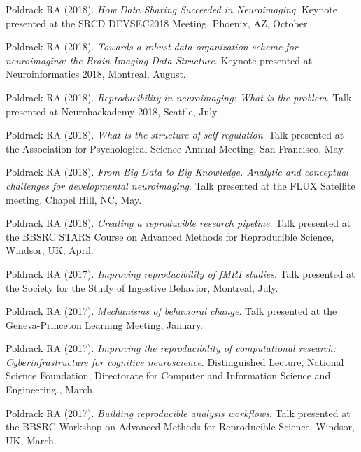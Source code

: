 \documentclass[10pt, letterpaper]{article}
\begin{document}
Poldrack RA (2018). \emph{How Data Sharing Succeeded in Neuroimaging}. Keynote presented at the SRCD DEVSEC2018 Meeting, Phoenix, AZ, October. \vspace{2mm}

Poldrack RA (2018). \emph{Towards a robust data organization scheme for neuroimaging: the Brain Imaging Data Structure}. Keynote presented at Neuroinformatics 2018, Montreal, August. \vspace{2mm}

Poldrack RA (2018). \emph{Reproducibility in neuroimaging: What is the problem}. Talk presented at Neurohackademy 2018, Seattle, July. \vspace{2mm}

Poldrack RA (2018). \emph{What is the structure of self-regulation}. Talk presented at the Association for Psychological Science Annual Meeting, San Francisco, May. \vspace{2mm}

Poldrack RA (2018). \emph{From Big Data to Big Knowledge. Analytic and conceptual challenges for developmental neuroimaging}. Talk presented at the FLUX Satellite meeting, Chapel Hill, NC, May. \vspace{2mm}

Poldrack RA (2018). \emph{Creating a reproducible research pipeline}. Talk presented at the BBSRC STARS Course on Advanced Methods for Reproducible Science, Windsor, UK, April. \vspace{2mm}

Poldrack RA (2017). \emph{Improving reproducibility of fMRI studies}. Talk presented at the Society for the Study of Ingestive Behavior, Montreal, July. \vspace{2mm}

Poldrack RA (2017). \emph{Mechanisms of behavioral change}. Talk presented at the Geneva-Princeton Learning Meeting, January. \vspace{2mm}

Poldrack RA (2017). \emph{Improving the reproducibility of computational research: Cyberinfrastructure for cognitive neuroscience}. Distinguished Lecture, National Science Foundation, Directorate for Computer and Information Science and Engineering., March. \vspace{2mm}

Poldrack RA (2017). \emph{Building reproducible analysis workflows}. Talk presented at the BBSRC Workshop on Advanced Methods for Reproducible Science. Windsor, UK, March. \vspace{2mm}
\end{document}
